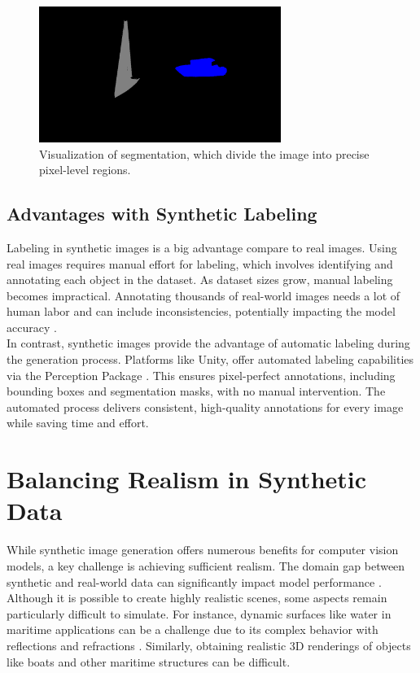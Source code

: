 \begin{figure}[H]
    \centering
    \includegraphics[width=0.7\textwidth]{Figures/segmentation_2.png}
    \caption{Visualization of segmentation, which divide the image into precise pixel-level regions.}
    \label{fig:image3}
\end{figure}



\subsection{Advantages with Synthetic Labeling}
Labeling in synthetic images is a big advantage compare to real images. Using real images requires manual effort for labeling, which involves identifying and annotating each object in the dataset. As dataset sizes grow, manual labeling becomes impractical. Annotating thousands of real-world images needs a lot of human labor and can include inconsistencies, potentially impacting the model accuracy \cite{nikolenko2021synthetic}.\\

\noindent In contrast, synthetic images provide the advantage of automatic labeling during the generation process. Platforms like Unity, offer automated labeling capabilities via the Perception Package \cite{unity-perception2022}. This ensures pixel-perfect annotations, including bounding boxes and segmentation masks, with no manual intervention. The automated process delivers consistent, high-quality annotations for every image while saving time and effort.


\section{Balancing Realism in Synthetic Data}
While synthetic image generation offers numerous benefits for computer vision models, a key challenge is achieving sufficient realism. The domain gap between synthetic and real-world data can significantly impact model performance \cite{nikolenko2021synthetic}.  Although it is possible to create highly realistic scenes, some aspects remain particularly difficult to simulate. For instance, dynamic surfaces like water in maritime applications can be a challenge due to its complex behavior with reflections and refractions \cite{waterrendering}. Similarly, obtaining realistic 3D renderings of objects like boats and other maritime structures can be difficult.\\

